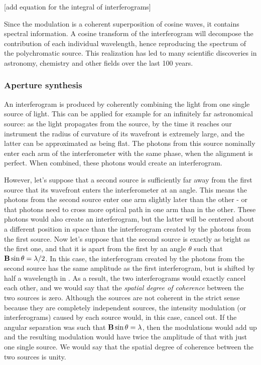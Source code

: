 [add equation for the integral of interferograms]

Since the modulation is a coherent superposition of cosine waves, it contains spectral information. A cosine transform of the interferogram will decompose the contribution of each individual wavelength, hence reproducing the spectrum of the polychromatic source. This realization has led to many scientific discoveries in astronomy, chemistry and other fields over the last 100 years.

\subsubsection{Aperture synthesis}

An interferogram is produced by coherently combining the light from one single source of light. This can be applied for example for an infinitely far astronomical source: as the light propagates from the source, by the time it reaches our instrument the radius of curvature of its wavefront is extremely large, and the latter can be approximated as being flat. The photons from this source nominally enter each arm of the interferometer with the same phase, when the alignment is perfect. When combined, these photons would create an interferogram.

However, let's suppose that a second source is sufficiently far away from the first source that its wavefront enters the interferometer at an angle. This means the photons from the second source enter one arm slightly later than the other - or that photons need to cross more optical path in one arm than in the other. These photons would also create an interferogram, but the latter will be centered about a different position in \OPD  space than the interferogram created by the photons from the first source. Now let's suppose that the second source is exactly as bright as the first one, and that it is apart from the first by an angle $\theta$ such that $\mathbf{B}\sin\theta = \lambda/2$. In this case,  the interferogram created by the photons from the second source has the same amplitude as the first interferogram, but is shifted by half a wavelength in \OPD. As a result, the two interferograms would exactly cancel each other, and we would say that the \textit{spatial degree of coherence} between the two sources is zero. Although the sources are not coherent in the strict sense because they are completely independent sources, the intensity modulation (or interferograms) caused by each source would, in this case, cancel out. If the angular separation was such that $\mathbf{B}\sin\theta = \lambda$, then the modulations would add up and the resulting modulation would have twice the amplitude of that with just one single source. We would say that the spatial degree of coherence between the two sources is unity. 

